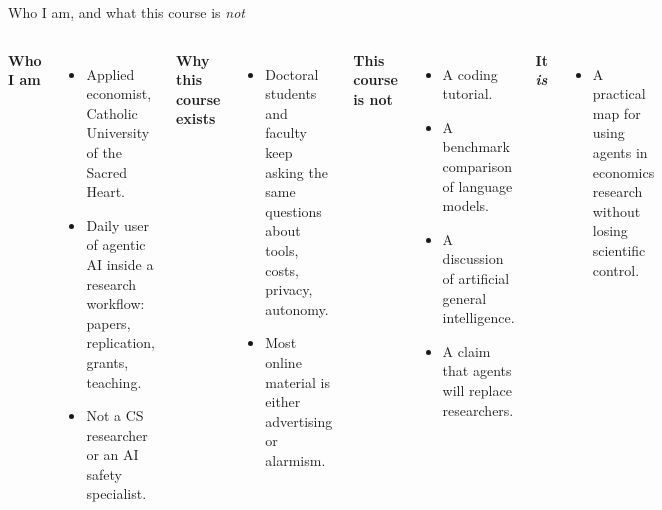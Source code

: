\begin{frame}{Who I am, and what this course is \emph{not}}
  \begin{columns}[T,onlytextwidth]
      \textbf{Who I am}
      \begin{itemize}\setlength\itemsep{0.35em}
        \item Applied economist, Catholic University of the Sacred Heart.
        \item Daily user of agentic AI inside a research workflow: papers, replication, grants, teaching.
        \item Not a CS researcher or an AI safety specialist.
      \end{itemize}
      \vspace{0.3cm}
      \textbf{Why this course exists}
      \begin{itemize}\setlength\itemsep{0.35em}
        \item Doctoral students and faculty keep asking the same questions about tools, costs, privacy, autonomy.
        \item Most online material is either advertising or alarmism.
      \end{itemize}
      \textbf{This course is \alert{not}}
      \begin{itemize}\setlength\itemsep{0.35em}
        \item A coding tutorial.
        \item A benchmark comparison of language models.
        \item A discussion of artificial general intelligence.
        \item A claim that agents will replace researchers.
      \end{itemize}
      \vspace{0.3cm}
      \textbf{It \emph{is}}
      \begin{itemize}\setlength\itemsep{0.35em}
        \item A practical map for using agents in economics research without losing scientific control.
      \end{itemize}
  \end{columns}
\end{frame}


